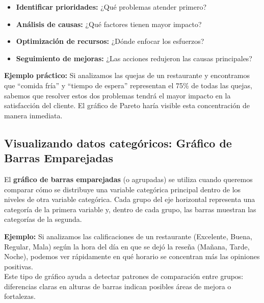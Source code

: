 \documentclass[
  spanish,
  letterpaper,
  DIV=11,
  numbers=noendperiod]{scrreprt}
\providecommand{\tightlist}{%
  \setlength{\itemsep}{0pt}\setlength{\parskip}{0pt}}
\begin{document}
\begin{tcolorbox}[enhanced jigsaw, arc=.35mm, leftrule=.75mm, colbacktitle=quarto-callout-tip-color!10!white, left=2mm, opacitybacktitle=0.6, toptitle=1mm, title=\textcolor{quarto-callout-tip-color}{\faLightbulb}\hspace{0.5em}{¿Cuándo usar un gráfico de Pareto?}, colframe=quarto-callout-tip-color-frame, toprule=.15mm, colback=white, rightrule=.15mm, opacityback=0, coltitle=black, breakable, bottomtitle=1mm, titlerule=0mm, bottomrule=.15mm]

\begin{itemize}
\tightlist
\item
  \textbf{Identificar prioridades:} ¿Qué problemas atender primero?
\item
  \textbf{Análisis de causas:} ¿Qué factores tienen mayor impacto?
\item
  \textbf{Optimización de recursos:} ¿Dónde enfocar los esfuerzos?
\item
  \textbf{Seguimiento de mejoras:} ¿Las acciones redujeron las causas
  principales?
\end{itemize}

\end{tcolorbox}

\textbf{Ejemplo práctico:} Si analizamos las quejas de un restaurante y
encontramos que ``comida fría'' y ``tiempo de espera'' representan el
75\% de todas las quejas, sabemos que resolver estos dos problemas
tendrá el mayor impacto en la satisfacción del cliente. El gráfico de
Pareto haría visible esta concentración de manera inmediata.

\subsection{Visualizando datos categóricos: Gráfico de Barras
Emparejadas}\label{visualizando-datos-categuxf3ricos-gruxe1fico-de-barras-emparejadas}

El \textbf{gráfico de barras emparejadas} (o agrupadas) se utiliza
cuando queremos comparar cómo se distribuye una variable categórica
principal dentro de los niveles de otra variable categórica. Cada grupo
del eje horizontal representa una categoría de la primera variable y,
dentro de cada grupo, las barras muestran las categorías de la segunda.

\textbf{Ejemplo:} Si analizamos las calificaciones de un restaurante
(Excelente, Buena, Regular, Mala) según la hora del día en que se dejó
la reseña (Mañana, Tarde, Noche), podemos ver rápidamente en qué horario
se concentran más las opiniones positivas.\\
Este tipo de gráfico ayuda a detectar patrones de comparación entre
grupos: diferencias claras en alturas de barras indican posibles áreas
de mejora o fortalezas.
\end{document}
